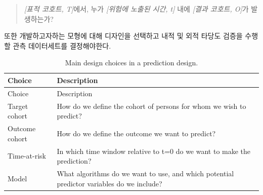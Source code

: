 \documentclass[11pt]{book}
\theoremstyle{definition}
\theoremstyle{definition}
\theoremstyle{definition}
\theoremstyle{remark}
\begin{document}
\begin{quote}
\emph{{[}표적 코호트, T{]}}에서, 누가 \emph{{[}위험에 노출된 시간, t{]}}
내에 \emph{{[}결과 코호트, O{]}}가 발생하는가?
\end{quote}

또한 개발하고자하는 모형에 대해 디자인을 선택하고 내적 및 외적 타당도
검증을 수행할 관측 데이터세트를 결정해야한다.

\begin{longtable}[]{@{}ll@{}}
\caption{\label{tab:plpDesign} Main design choices in a prediction
design.}\tabularnewline
\toprule
\begin{minipage}[b]{0.23\columnwidth}\raggedright\strut
Choice\strut
\end{minipage} & \begin{minipage}[b]{0.71\columnwidth}\raggedright\strut
Description\strut
\end{minipage}\tabularnewline
\midrule
\endfirsthead
\toprule
\begin{minipage}[b]{0.23\columnwidth}\raggedright\strut
Choice\strut
\end{minipage} & \begin{minipage}[b]{0.71\columnwidth}\raggedright\strut
Description\strut
\end{minipage}\tabularnewline
\midrule
\endhead
\begin{minipage}[t]{0.23\columnwidth}\raggedright\strut
Target cohort\strut
\end{minipage} & \begin{minipage}[t]{0.71\columnwidth}\raggedright\strut
How do we define the cohort of persons for whom we wish to
predict?\strut
\end{minipage}\tabularnewline
\begin{minipage}[t]{0.23\columnwidth}\raggedright\strut
Outcome cohort\strut
\end{minipage} & \begin{minipage}[t]{0.71\columnwidth}\raggedright\strut
How do we define the outcome we want to predict?\strut
\end{minipage}\tabularnewline
\begin{minipage}[t]{0.23\columnwidth}\raggedright\strut
Time-at-risk\strut
\end{minipage} & \begin{minipage}[t]{0.71\columnwidth}\raggedright\strut
In which time window relative to t=0 do we want to make the
prediction?\strut
\end{minipage}\tabularnewline
\begin{minipage}[t]{0.23\columnwidth}\raggedright\strut
Model\strut
\end{minipage} & \begin{minipage}[t]{0.71\columnwidth}\raggedright\strut
What algorithms do we want to use, and which potential predictor
variables do we include?\strut
\end{minipage}\tabularnewline
\bottomrule
\end{longtable}
\end{document}
